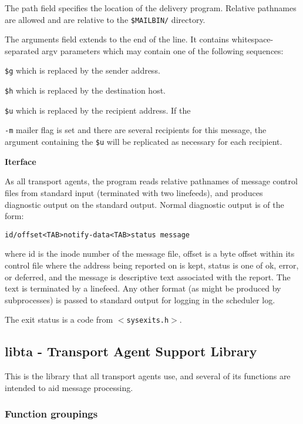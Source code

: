 The path field specifies the location of the delivery program. 
Relative pathnames are allowed and are relative to
the {\tt \$MAILBIN/} directory.

The arguments field extends to the end of the line. It
contains whitespace-separated argv parameters which may
contain one of the following sequences:

{\tt \$g} which is replaced by the sender address.

{\tt \$h} which is replaced by the destination host.

{\tt \$u} which is replaced by the recipient address. If the

{\tt -m} mailer flag is set and there are several recipients for this message, the argument containing the {\tt \$u} will be replicated as necessary for each recipient.

{\bf Iterface}

As all transport agents, the program reads relative pathnames 
of message control files from standard input (terminated 
with two linefeeds), and produces diagnostic output
on the standard output. Normal diagnostic output is of
the form:

\begin{verbatim}
id/offset<TAB>notify-data<TAB>status message
\end{verbatim}


where id is the inode number of the message file, offset
is a byte offset within its control file where the address
being reported on is kept, status is one of ok, error, or
deferred, and the message is descriptive text associated
with the report. The text is terminated by a linefeed.
Any other format (as might be produced by subprocesses) is
passed to standard output for logging in the scheduler
log.

The exit status is a code from {\tt {\(<\)}sysexits.h{\(>\)}}.


\subsection{libta - Transport Agent Support Library}


This is the library that all transport agents use, and several of its
functions are intended to aid message processing.


\subsubsection{Function groupings}

